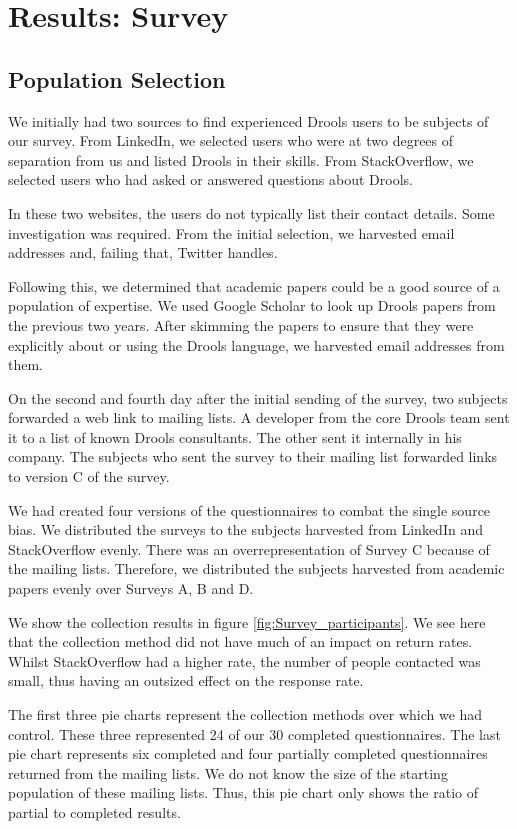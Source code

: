 \section{Results: Survey}
\label{section:survey_results}

\subsection{Population Selection}
We initially had two sources to find experienced Drools users to be subjects of our survey.
From LinkedIn, we selected users who were at two degrees of separation from us and listed Drools in their skills.
From StackOverflow, we selected users who had asked or answered questions about Drools. 

In these two websites, the users do not typically list their contact details.
Some investigation was required.
From the initial selection, we harvested email addresses and, failing that, Twitter handles.

Following this, we determined that academic papers could be a good source of a population of expertise.
We used Google Scholar to look up Drools papers from the previous two years.
After skimming the papers to ensure that they were explicitly about or using the Drools language, we harvested email addresses from them.

On the second and fourth day after the initial sending of the survey, two subjects forwarded a web link to mailing lists.
A developer from the core Drools team sent it to a list of known Drools consultants.
The other sent it internally in his company.
The subjects who sent the survey to their mailing list forwarded links to version C of the survey.

We had created four versions of the questionnaires to combat the single source bias.
We distributed the surveys to the subjects harvested from LinkedIn and StackOverflow evenly.
There was an overrepresentation of Survey C because of the mailing lists.
Therefore, we distributed the subjects harvested from academic papers evenly over Surveys A, B and D.

We show the collection results in figure \ref{fig:Survey_participants}.
We see here that the collection method did not have much of an impact on return rates.
Whilst StackOverflow had a higher rate, the number of people contacted was small, thus having an outsized effect on the response rate.

The first three pie charts represent the collection methods over which we had control.
These three represented 24 of our 30 completed questionnaires.
The last pie chart represents six completed and four partially completed questionnaires returned from the mailing lists.
We do not know the size of the starting population of these mailing lists. 
Thus, this pie chart only shows the ratio of partial to completed results.

